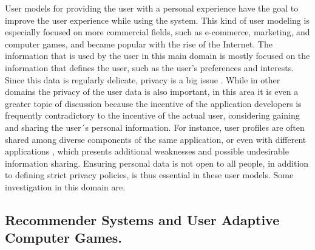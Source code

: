 User models for providing the user with a personal experience have the goal to
improve the user experience while using the system.  This kind of user modeling
is especially focused on more commercial fields, such as e-commerce, marketing,
and computer games, and became popular with the rise of the Internet.  The
information that is used by the user in this main domain is mostly focused on
the information that defines the user, such as the user’s preferences and
interests. Since this data is regularly delicate, privacy is a  big issue \cite{toch2012personalization}. While in other domains the privacy of the user data is also
important, in this area it is even a greater topic of discussion because the
incentive of the application developers is frequently contradictory to the
incentive of the actual user, considering gaining and sharing the user´s
personal information. For instance, user profiles are often shared among diverse
components of the same application, or even with different applications \cite{brun2010compass} \cite{karam2012modeling}, which presents additional weaknesses and
possible undesirable information sharing.  Ensuring personal data is not open to
all people, in addition to defining strict privacy policies, is thus essential
in these user models. Some investigation in this domain are.

\subsection{Recommender Systems and User Adaptive Computer Games.}

